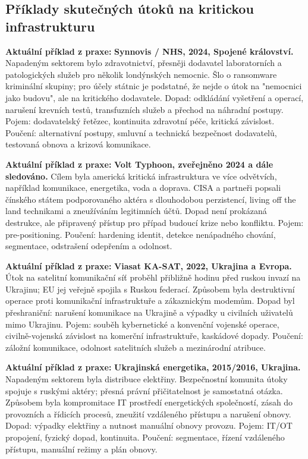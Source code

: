 \documentclass[11pt,a4paper]{article}
\newcommand{\aktualni}[1]{\begin{tcolorbox}[breakable,enhanced,colback=green!10,colframe=green!35!black,boxrule=0pt,arc=1mm,left=5pt,right=5pt,top=5pt,bottom=5pt,before skip=6pt,after skip=6pt]\textbf{Aktuální příklad z praxe:} #1\end{tcolorbox}}
\begin{document}
\subsection*{Příklady skutečných útoků na kritickou infrastrukturu}
\aktualni{\textbf{Synnovis / NHS, 2024, Spojené království.} Napadeným sektorem bylo zdravotnictví, přesněji dodavatel laboratorních a patologických služeb pro několik londýnských nemocnic. Šlo o ransomware kriminální skupiny; pro účely státnic je podstatné, že nejde o útok na "nemocnici jako budovu", ale na kritického dodavatele. Dopad: odkládání vyšetření a operací, narušení krevních testů, transfuzních služeb a přechod na náhradní postupy. Pojem: dodavatelský řetězec, kontinuita zdravotní péče, kritická závislost. Poučení: alternativní postupy, smluvní a technická bezpečnost dodavatelů, testovaná obnova a krizová komunikace.}

\aktualni{\textbf{Volt Typhoon, zveřejněno 2024 a dále sledováno.} Cílem byla americká kritická infrastruktura ve více odvětvích, například komunikace, energetika, voda a doprava. CISA a partneři popsali čínského státem podporovaného aktéra s dlouhodobou perzistencí, living off the land technikami a zneužíváním legitimních účtů. Dopad není prokázaná destrukce, ale připravený přístup pro případ budoucí krize nebo konfliktu. Pojem: pre-positioning. Poučení: hardening identit, detekce nenápadného chování, segmentace, odstrašení odepřením a odolnost.}

\aktualni{\textbf{Viasat KA-SAT, 2022, Ukrajina a Evropa.} Útok na satelitní komunikační síť proběhl přibližně hodinu před ruskou invazí na Ukrajinu; EU jej veřejně spojila s Ruskou federací. Způsobem byla destruktivní operace proti komunikační infrastruktuře a zákaznickým modemům. Dopad byl přeshraniční: narušení komunikace na Ukrajině a výpadky u civilních uživatelů mimo Ukrajinu. Pojem: souběh kybernetické a konvenční vojenské operace, civilně-vojenská závislost na komerční infrastruktuře, kaskádové dopady. Poučení: záložní komunikace, odolnost satelitních služeb a mezinárodní atribuce.}

\aktualni{\textbf{Ukrajinská energetika, 2015/2016, Ukrajina.} Napadeným sektorem byla distribuce elektřiny. Bezpečnostní komunita útoky spojuje s ruskými aktéry; přesná právní přičitatelnost je samostatná otázka. Způsobem byla kompromitace IT prostředí energetických společností, zásah do provozních a řídicích procesů, zneužití vzdáleného přístupu a narušení obnovy. Dopad: výpadky elektřiny a nutnost manuální obnovy provozu. Pojem: IT/OT propojení, fyzický dopad, kontinuita. Poučení: segmentace, řízení vzdáleného přístupu, manuální režimy a plán obnovy.}
\end{document}
